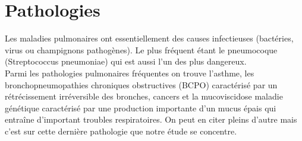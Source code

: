 		\section{Pathologies}
Les maladies pulmonaires ont essentiellement des causes infectieuses (bactéries, virus ou champignons pathogènes). Le plus fréquent étant le pneumocoque (Streptococcus pneumoniae) qui est aussi l’un des plus dangereux. \\
Parmi les pathologies pulmonaires fréquentes on trouve l’asthme, les bronchopneumopathies chroniques obstructives (BCPO) caractérisé par un rétrécissement irréversible des bronches, cancers et la mucoviscidose maladie génétique caractérisé par une production importante d’un mucus épais qui entraîne d’important troubles respiratoires. On peut en citer pleins d’autre mais c’est sur cette dernière pathologie que notre étude se concentre.






